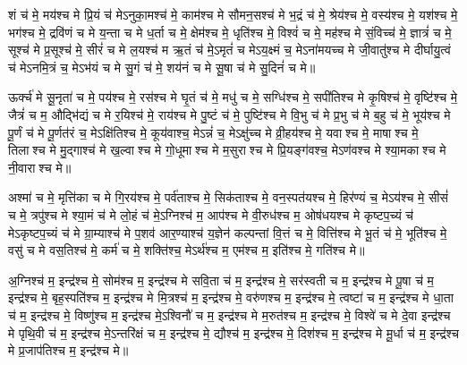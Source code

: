 शं च॑ मे॒ मय॑श्च मे प्रि॒यं च॑ मेऽनुका॒मश्च॑ मे॒ काम॑श्च मे सौमन॒सश्च॑ मे भ॒द्रं च॑ मे॒ श्रेय॑श्च मे॒ वस्य॑श्च मे॒ यश॑श्च मे॒ भग॑श्च मे॒ द्रवि॑णं च मे य॒न्ता च मे ध॒र्ता च मे॒ क्षेम॑श्च मे॒ धृति॑श्च मे॒ विश्वं॑ च मे॒ मह॑श्च मे सं॒विच्च॑ मे॒ ज्ञात्रं॑ च मे॒ सूश्च॑ मे प्र॒सूश्च॑ मे॒ सीरं॑ च मे ल॒यश्च॑ म ऋ॒तं च॑ मे॒ऽमृतं॑ च मेऽय॒क्ष्मं च॒ मेऽना॑मयच्च मे जी॒वातु॑श्च मे दीर्घायु॒त्वं च॑ मेऽनमि॒त्रं च॒ मेऽभ॑यं च मे सु॒गं च॑ मे॒ शय॑नं च मे सू॒षा च॑ मे सु॒दिनं॑ च मे॥




ऊर्क्च॑ मे सू॒नृता॑ च मे॒ पय॑श्च मे॒ रस॑श्च मे घृ॒तं च॑ मे॒ मधु॑ च मे॒ सग्धि॑श्च मे॒ सपी॑तिश्च मे कृ॒षिश्च॑ मे॒ वृष्टि॑श्च मे॒ जैत्रं॑ च म॒ औद्भि॑द्यं च मे र॒यिश्च॑ मे॒ राय॑श्च मे पु॒ष्टं च॑ मे॒ पुष्टि॑श्च मे वि॒भु च॑ मे प्र॒भु च॑ मे ब॒हु च॑ मे॒ भूय॑श्च मे पू॒र्णं च॑ मे पू॒र्णत॑रं च॒ मेऽक्षि॑तिश्च मे॒ कूय॑वाश्च॒ मेऽन्नं॑ च॒ मेऽक्षु॑च्च मे व्री॒हय॑श्च मे॒ यवाश्च मे॒ माषाश्च मे॒ तिलाश्च मे मु॒द्गाश्च॑ मे ख॒ल्वाश्च मे गो॒धूमाश्च मे म॒सुराश्च मे प्रि॒यङ्ग॑वश्च॒ मेऽण॑वश्च मे श्या॒मकाश्च मे नी॒वाराश्च मे॥ 



अश्मा॑ च मे॒ मृत्ति॑का च मे गि॒रय॑श्च मे॒ पर्व॑ताश्च मे॒ सिक॑ताश्च मे॒ वन॒स्पत॑यश्च मे॒ हिर॑ण्यं च॒ मेऽय॑श्च मे॒ सीसं॑ च मे॒ त्रपु॑श्च मे श्या॒मं च॑ मे लो॒हं च॑ मे॒ऽग्निश्च॑ म॒ आप॑श्च मे वी॒रुध॑श्च म॒ ओष॑धयश्च मे कृष्टप॒च्यं च॑ मेऽकृष्टप॒च्यं च॑ मे ग्रा॒म्याश्च॑ मे प॒शव॑ आर॒ण्याश्च॑ य॒ज्ञेन॑ कल्पन्तां वि॒त्तं च मे॒ वित्ति॑श्च मे भू॒तं च॑ मे॒ भूति॑श्च मे॒ वसु॑ च मे वस॒तिश्च॑ मे॒ कर्म॑ च मे॒ शक्ति॑श्च॒ मेऽर्थ॑श्च म॒ एम॑श्च म॒ इति॑श्च मे॒ गति॑श्च मे॥



अ॒ग्निश्च॑ म॒ इन्द्र॑श्च मे॒ सोम॑श्च म॒ इन्द्र॑श्च मे सवि॒ता च॑ म॒ इन्द्र॑श्च मे॒ सर॑स्वती च म॒ इन्द्र॑श्च मे पू॒षा च॑ म॒ इन्द्र॑श्च मे॒ बृह॒स्पति॑श्च म॒ इन्द्र॑श्च मे मि॒त्रश्च॑ म॒ इन्द्र॑श्च मे॒ वरु॑णश्च म॒ इन्द्र॑श्च मे॒ त्वष्टा॑ च म॒ इन्द्र॑श्च मे धा॒ता च॑ म॒ इन्द्र॑श्च मे॒ विष्णु॑श्च म॒ इन्द्र॑श्च मे॒ऽश्विनौ॑ च म॒ इन्द्र॑श्च मे म॒रुत॑श्च म॒ इन्द्र॑श्च मे॒ विश्वे॑ च मे दे॒वा इन्द्र॑श्च मे पृथि॒वी च॑ म॒ इन्द्र॑श्च मे॒ऽन्तरि॑क्षं च म॒ इन्द्र॑श्च मे॒ द्यौश्च॑ म॒ इन्द्र॑श्च मे॒ दिश॑श्च म॒ इन्द्र॑श्च मे मू॒र्धा च॑ म॒ इन्द्र॑श्च मे प्र॒जाप॑तिश्च म॒ इन्द्र॑श्च मे॥

